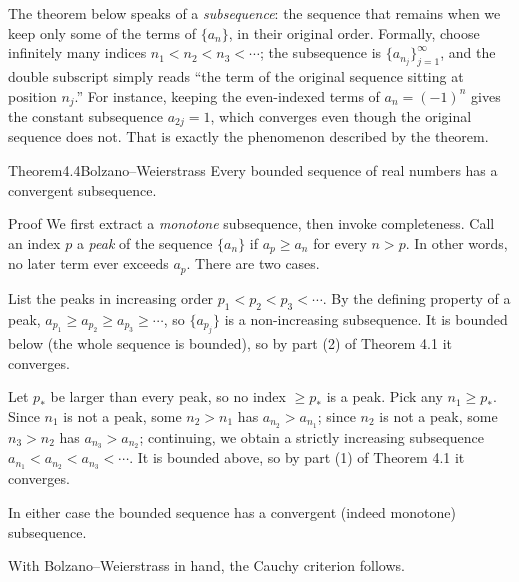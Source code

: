 \documentclass[a4paper,12pt,oneside]{memoir}
\begin{document}
The theorem below speaks of a \emph{subsequence}: the sequence that remains when we keep only some of the terms of \(\{a_{n}\}\), in their original order. Formally, choose infinitely many indices \(n_{1} < n_{2} < n_{3} < \cdots\); the subsequence is \(\{a_{n_{j}}\}_{j = 1}^{\infty}\), and the double subscript simply reads “the term of the original sequence sitting at position \(n_{j}\).” For instance, keeping the even-indexed terms of \(a_{n} = (-1)^{n}\) gives the constant subsequence \(a_{2j} = 1\), which converges even though the original sequence does not. That is exactly the phenomenon described by the theorem.

\begin{envtheorem}{Theorem}{4.4}{Bolzano–Weierstrass}
Every bounded sequence of real numbers has a convergent subsequence.
\end{envtheorem}
\begin{envproof}{Proof}{}{}
We first extract a \emph{monotone} subsequence, then invoke completeness. Call an index \(p\) a \emph{peak} of the sequence \(\{a_{n}\}\) if \(a_{p} \ge a_{n}\) for every \(n > p\). In other words, no later term ever exceeds \(a_{p}\). There are two cases.

List the peaks in increasing order \(p_{1} < p_{2} < p_{3} < \cdots\). By the defining property of a peak, \(a_{p_{1}} \ge a_{p_{2}} \ge a_{p_{3}} \ge \cdots\), so \(\{a_{p_{j}}\}\) is a non-increasing subsequence. It is bounded below (the whole sequence is bounded), so by part (2) of Theorem 4.1 it converges.

Let \(p_{*}\) be larger than every peak, so no index \(\ge p_{*}\) is a peak. Pick any \(n_{1} \ge p_{*}\). Since \(n_{1}\) is not a peak, some \(n_{2} > n_{1}\) has \(a_{n_{2}} > a_{n_{1}}\); since \(n_{2}\) is not a peak, some \(n_{3} > n_{2}\) has \(a_{n_{3}} > a_{n_{2}}\); continuing, we obtain a strictly increasing subsequence \(a_{n_{1}} < a_{n_{2}} < a_{n_{3}} < \cdots\). It is bounded above, so by part (1) of Theorem 4.1 it converges.

In either case the bounded sequence has a convergent (indeed monotone) subsequence. \qedmark
\end{envproof}
With Bolzano–Weierstrass in hand, the Cauchy criterion follows.
\end{document}
